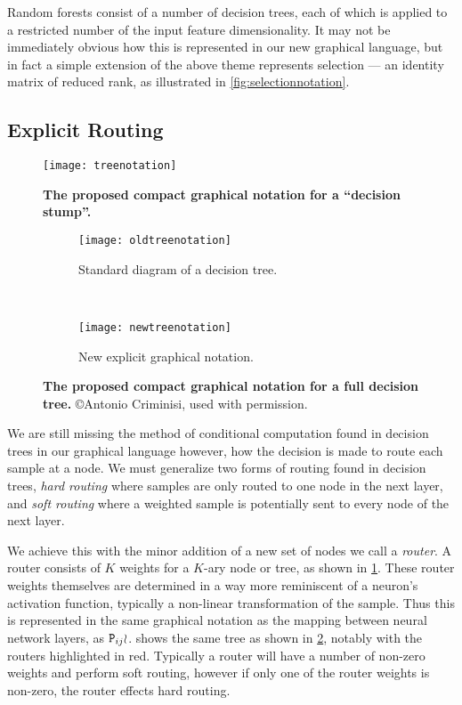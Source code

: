 \documentclass[thesis]{subfiles}
\begin{document}
	Random forests consist of a number of decision trees, each of which is applied to a restricted number of the input feature dimensionality. It may not be immediately obvious how this is represented in our new graphical language, but in fact a simple extension of the above theme represents selection --- \ie an identity matrix of reduced rank, as illustrated in \cref{fig:selectionnotation}.
	
	\subsection{Explicit Routing}
	\begin{figure}[htbp!] 
		\centering
		\texttt{[image: treenotation]}
		\caption[Proposed graphical notation for a decision stump]{\textbf{The proposed compact graphical notation for a ``decision stump''.}}\label{fig:treeNotation}
	\end{figure}
	
	\begin{figure}[tbp] 
		\centering
		\begin{subfigure}[b]{0.4\textwidth}
			\centering
			\texttt{[image: oldtreenotation]}
			\caption{Standard diagram of a decision tree.}\label{fig:oldtreenotation}
		\end{subfigure}
		~
		\begin{subfigure}[b]{0.4\textwidth}
			\centering
			\texttt{[image: newtreenotation]}
			\caption{New explicit graphical notation.}\label{fig:newtreenotation}
		\end{subfigure}
		\caption[Proposed compact graphical notation for a decision tree]{\textbf{The proposed compact graphical notation for a full decision tree.} \copyright Antonio Criminisi, used with permission.}\label{fig:complexDecisionTree}
	\end{figure}
	
	We are still missing the method of conditional computation found in decision trees in our graphical language however, \ie how the decision is made to route each sample at a node. We must generalize two forms of routing found in decision trees, \emph{hard routing} where samples are only routed to one node in the next layer, and \emph{soft routing} where a weighted sample is potentially sent to every node of the next layer.
	
	We achieve this with the minor addition of a new set of nodes we call a \emph{router}. A router consists of $K$ weights for a $K$-ary node or tree, as shown in \cref{fig:treeNotation}. These router weights themselves are determined in a way more reminiscent of a neuron's activation function, typically a non-linear transformation of the sample. Thus this is represented in the same graphical notation as the mapping between neural network layers, \ie as $\mat P_{ij} \wr$.  shows the same tree as shown in \cref{fig:oldtreenotation}, notably with the routers highlighted in red. Typically a router will have a number of non-zero weights and perform soft routing, however if only one of the router weights is non-zero, the router effects hard routing.
	
\end{document}
